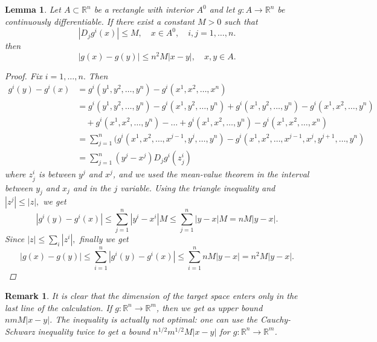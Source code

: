 \documentclass[12pt]{article}
\def\RR{\mathbb{R}}
\newtheorem{lemma}[theorem]{Lemma}
\newtheorem*{remark}{Remark}
\begin{document}
\begin{lemma}
Let $A \subset \RR^n$ be a rectangle with interior $A^{0}$ and let $g : A \rightarrow\RR^n$ be continuously differentiable. If there exist a constant $M > 0$ such that 
\[ |D_{j}g^{i}(x)| \leq M, \quad x \in A^{0}, \quad i,j=1, \dots , n. \]
then
\[ |g(x) - g(y)| \leq n^{2}M|x-y|, \quad x,y \in A.\]
\begin{proof}
 Fix $ i = 1, \dots , n.$ Then
\begin{align*}
g^{i}(y) - g^{i}(x) &= g^{i}(y^1 , y^2 , \dots , y^n) - g^{i}(x^1 , x^ 2 , \dots , x^n )\\
&= g^{i}(y^1 , y^2 , \dots , y^n) - g^{i}(x^1 , y^2 , \dots , y^n)  +  g^{i}(x^1 , y^2 , \dots , y^n)  - g^{i}(x^1 , x^ 2 , \dots , y^n )\\ 
& \quad +  g^{i}(x^1 , x^ 2 , \dots , y^n ) - \dots +  g^{i}(x^1 , x^ 2 , \dots , y^n ) -  g^{i}(x^1 , x^ 2 , \dots , x^n )\\ &= \sum^{n}_{j=1}(g^{i}(x^1 , x^ 2 , \dots , x^{j-1} , y^{j}, \dots , y^n ) - g^{i}(x^1 , x^ 2 , \dots , x^{j-1} , x^{j}, y ^{j+1}, \dots , y^n ) \\
&= \sum^{n}_{j=1}(y^{j} \! -\! x^{j})D_{j}g^{i}(z^{i}_{j})
\end{align*}
where $z^{i}_{j}$ is between $y^j$ and $x^j$, and we used the mean-value theorem in the interval between
$y_j$ and $x_j$ and in the $j$ variable. Using the triangle inequality and $|z^j| \leq |z|, $ we get
\[ |g^{i}(y) - g^{i}(x)| \leq \sum^{n}_{j=1}|y^{i} - x^{i}|M \leq \sum^{n}_{j=1}|y - x|M = nM|y-x|.\]
Since $|z| \leq \sum_{i}|z^i |, $ finally we get
 \[ |g(x) - g(y)| \leq \sum^{n}_{i=1}|g^{i}(y) - g^{i}(x)| \leq  \sum^{n}_{i=1} nM|y-x| =  n^{2}M|y-x|. \]
\end{proof}
\end{lemma}
\begin{remark}
 It is clear that the dimension of the target space enters only in the last line of
the calculation. If $g : \RR^n \rightarrow \RR^m$, then we get as upper bound $nmM|x- y|$. The inequality
is actually not optimal: one can use the Cauchy-Schwarz inequality twice to get a bound
$n^{1/2}m^{1/2}M|x-y|$ for $g:\RR^n \rightarrow \RR^m$.
\end{remark}

\setcounter{equation}{0}
\end{document}
